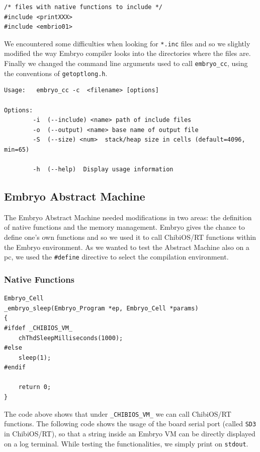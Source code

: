 \documentclass[a4paper,10pt]{article}
\begin{document}
\begin{multicols}{2}
\begin{lstlisting}[caption={include directives in Embryo}]
/* files with native functions to include */
#include <printXXX>
#include <embrio01>

\end{lstlisting}
We encountered some difficulties when looking for \texttt{*.inc} files and so we slightly modified the way Embryo compiler looks into the directories where the files are.\\
Finally we changed the command line arguments used to call \texttt{embryo\_cc}, using the conventions of \texttt{getoptlong.h}.
\bigskip
\lstset{language=bash}
\begin{lstlisting}[caption={Command line arguments}]
Usage:   embryo_cc -c  <filename> [options]

Options:
        -i  (--include) <name> path of include files
        -o  (--output) <name> base name of output file
        -S  (--size) <num>  stack/heap size in cells (default=4096, min=65)

        -h  (--help)  Display usage information
\end{lstlisting}


\subsection{Embryo Abstract Machine}

The Embryo Abstract Machine needed modifications in two areas: the definition of native functions and the memory management. Embryo gives the chance to define one's own functions and so we used it to call ChibiOS/RT functions within the Embryo environment. As we wanted to test the Abstract Machine also on a pc, we used the \texttt{\#define} directive to select the compilation environment.

\subsubsection{Native Functions}
\lstset{language=C}
\begin{lstlisting}[caption={Native function \textit{sleep}}]
Embryo_Cell
_embryo_sleep(Embryo_Program *ep, Embryo_Cell *params)
{
#ifdef _CHIBIOS_VM_
	chThdSleepMilliseconds(1000);
#else
	sleep(1);
#endif

	return 0;
}
\end{lstlisting}
\bigskip
The code above shows that under \texttt{\_CHIBIOS\_VM\_} we can call ChibiOS/RT functions.\newline
The following code shows the usage of the board serial port (called \texttt{SD3} in ChibiOS/RT), so that a string inside an Embryo VM can be directly displayed on a log terminal. While testing the functionalities, we simply print on \texttt{stdout}.


\end{multicols}
\end{document}
